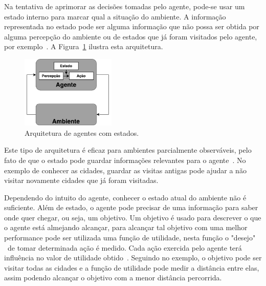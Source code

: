 Na tentativa de aprimorar as decisões tomadas pelo agente, pode-se usar um estado interno para marcar qual a situação do ambiente. A informação representada no estado pode ser alguma informação que não possa ser obtida por alguma percepção do ambiente ou de estados que já foram visitados pelo agente, por exemplo~\cite[Capítulo 7]{intelligence2003modern}. A Figura~\ref{fig:agenteModelbased} ilustra esta arquitetura. 

\begin{figure}[ht]
	\centering
	\includegraphics[width=0.4\textwidth]{fig/agentModel.pdf}
	\caption{Arquitetura de agentes com estados.}
	\label{fig:agenteModelbased}
\end{figure} 

Este tipo de arquitetura é eficaz para ambientes parcialmente observáveis, pelo fato de que o estado pode guardar informações relevantes para o agente~\cite[Capítulo 7]{intelligence2003modern}. No exemplo de conhecer as cidades, guardar as visitas antigas pode ajudar a não visitar novamente cidades que já foram visitadas. 

Dependendo do intuito do agente, conhecer o estado atual do ambiente não é suficiente. Além de estado, o agente pode precisar de uma informação para saber onde quer chegar, ou seja, um objetivo. 
Um objetivo é usado para descrever o que o agente está almejando alcançar, para alcançar tal objetivo com uma melhor performance pode ser utilizada uma função de utilidade, nesta função o "desejo" ~de tomar determinada ação é medido. Cada ação exercida pelo agente terá influência no valor de utilidade obtido~\cite[Capítulo 7]{intelligence2003modern}. Seguindo no exemplo, o objetivo pode ser visitar todas as cidades e a função de utilidade pode medir a distância entre elas, assim podendo alcançar o objetivo com a menor distância percorrida. 


